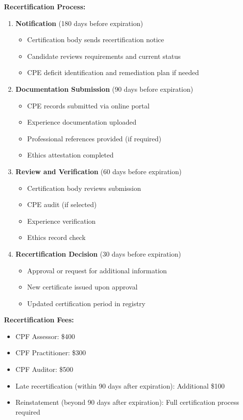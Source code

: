 \documentclass[11pt,a4paper]{article}
\begin{document}
\textbf{Recertification Process:}

\begin{enumerate}
\item \textbf{Notification} (180 days before expiration)
\begin{itemize}
\item Certification body sends recertification notice
\item Candidate reviews requirements and current status
\item CPE deficit identification and remediation plan if needed
\end{itemize}

\item \textbf{Documentation Submission} (90 days before expiration)
\begin{itemize}
\item CPE records submitted via online portal
\item Experience documentation uploaded
\item Professional references provided (if required)
\item Ethics attestation completed
\end{itemize}

\item \textbf{Review and Verification} (60 days before expiration)
\begin{itemize}
\item Certification body reviews submission
\item CPE audit (if selected)
\item Experience verification
\item Ethics record check
\end{itemize}

\item \textbf{Recertification Decision} (30 days before expiration)
\begin{itemize}
\item Approval or request for additional information
\item New certificate issued upon approval
\item Updated certification period in registry
\end{itemize}
\end{enumerate}

\textbf{Recertification Fees:}
\begin{itemize}
\item CPF Assessor: \$400
\item CPF Practitioner: \$300
\item CPF Auditor: \$500
\item Late recertification (within 90 days after expiration): Additional \$100
\item Reinstatement (beyond 90 days after expiration): Full certification process required
\end{itemize}
\end{document}
